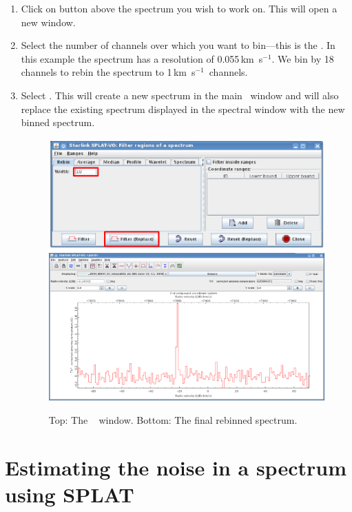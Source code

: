 \documentclass[11pt,oneside,chapters]{starlink}
\newcommand{\kms}{\mbox{$\,$km~s$^{-1}$}}   %
\newcommand{\kms}{\,km~s$^{-1}$}   %
\begin{document}
\begin{enumerate}[label=(\textbf{\arabic*})]

\item Click on  button
above the spectrum you wish to work on. This will open a new window.

\item Select the number of channels over which you want to
bin---this is the .
In this example the spectrum has a resolution of 0.055\kms. We
bin by 18 channels to rebin the spectrum to 1\kms\ channels.

\item Select . This will create a
new spectrum in the main \splat\ window and will also replace the
existing spectrum displayed in the spectral window with the new
binned spectrum.

\begin{figure}[h!]
\begin{center}
\includegraphics[width=0.6\linewidth]{sc20_splat_rebin}
\includegraphics[width=0.7\linewidth]{sc20_splat_rebin2}
\caption[Filter regions of a spectrum window.]{\label{fig:splat_rebin}
  Top: The \splat\  window.
  Bottom: The final rebinned spectrum.}
\end{center}
\end{figure}


\end{enumerate}


\section{Estimating the noise in a spectrum using SPLAT}
\label{sec:splat-stats}
\end{document}
